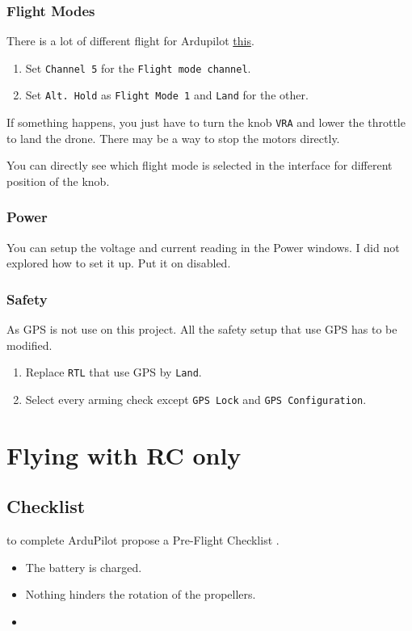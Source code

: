 \subsubsection{Flight Modes}
There is a lot of different flight for Ardupilot \href{http://ardupilot.org/copter/docs/flight-modes.html}{this}.
\begin{enumerate}
    \item Set \texttt{Channel 5} for the \texttt{Flight mode channel}.
    \item Set \texttt{Alt. Hold} as \texttt{Flight Mode 1} and \texttt{Land} for the other.
\end{enumerate}
If something happens, you just have to turn the knob \texttt{VRA} and lower the throttle to land the drone.
There may be a way to stop the motors directly.

You can directly see which flight mode is selected in the interface for different position of the knob.

\subsubsection{Power}
You can setup the voltage and current reading in the Power windows.
I did not explored how to set it up. Put it on disabled.

\subsubsection{Safety}
As GPS is not use on this project. All the safety setup that use GPS has to be modified.
\begin{enumerate}
    \item Replace \texttt{RTL} that use GPS by \texttt{Land}.
    \item Select every arming check except \texttt{GPS Lock} and \texttt{GPS Configuration}.
\end{enumerate}

\section{Flying with RC only}
\subsection{Checklist}
{\color{orange} to complete} ArduPilot propose a Pre-Flight Checklist \cite{ardupilot_checklist}.
\begin{itemize}
    \item The battery is charged.
    \item Nothing hinders the rotation of the propellers.
    \item
\end{itemize}

